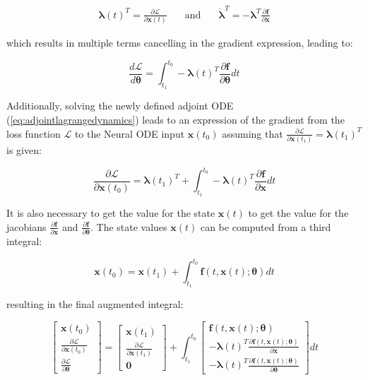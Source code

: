 \begin{equation}
    \begin{aligned}
        \bm{\lambda}(t)^T = \frac{\partial \mathcal{L}}{\partial \bm{x}(t)}
        & \quad \textrm{and} \quad & \dot{\bm{\lambda}}^T = - \bm{\lambda}^T \frac{\partial \bm{f}}{\partial \bm{x}}
    \end{aligned}
    \label{eq:adjointlagrangedynamics}
\end{equation}

\noindent which results in multiple terms cancelling in the gradient expression, leading to:

\begin{equation}
    \frac{d \mathcal{L}}{d \bm{\theta}} = \int_{t_1}^{t_0} -\bm{\lambda}(t)^T \frac{\partial \bm{f}}{\partial \bm{\theta}} dt
\end{equation}

Additionally, solving the newly defined adjoint ODE (\ref{eq:adjointlagrangedynamics}) leads to an expression of the gradient from the loss function $\mathcal{L}$ to the Neural ODE input $\bm{x}(t_0)$ assuming that $\frac{\partial \mathcal{L}}{\partial \bm{x}(t_1)} = \bm{\lambda}(t_1)^T$ is given:

\begin{equation}
    \frac{\partial \mathcal{L}}{\partial \bm{x}(t_0)} = \bm{\lambda}(t_1)^T + \int_{t_1}^{t_0} - \bm{\lambda}(t)^T \frac{\partial \bm{f}}{\partial \bm{x}} dt
\end{equation}

It is also necessary to get the value for the state $\bm{x}(t)$ to get the value for the jacobians $\frac{\partial \bm{f}}{\partial \bm{x}}$ and $\frac{\partial \bm{f}}{\partial \bm{\theta}}$. The state values $\bm{x}(t)$ can be computed from a third integral:

\begin{equation}
    \bm{x}(t_0) = \bm{x}(t_1) + \int_{t_1}^{t_0} \bm{f}(t, \bm{x}(t) ; \bm{\theta}) dt
\end{equation}

\noindent resulting in the final augmented integral:

\begin{equation}
    \begin{bmatrix}
    \bm{x}(t_0) \\
    \frac{\partial \mathcal{L}}{\partial \bm{x}(t_0)} \\
    \frac{\partial \mathcal{L}}{\partial \bm{\theta}}
    \end{bmatrix} = \begin{bmatrix}
    \bm{x}(t_1) \\
    \frac{\partial \mathcal{L}}{\partial \bm{x}(t_1)} \\
    \bm{0}
    \end{bmatrix} + \int_{t_1}^{t_0} \begin{bmatrix}
    \bm{f}(t, \bm{x}(t) ; \bm{\theta}) \\
    - \bm{\lambda}(t)^T \frac{\partial \bm{f}(t, \bm{x}(t) ; \bm{\theta})}{\partial \bm{x}} \\
    - \bm{\lambda}(t)^T \frac{\partial \bm{f}(t, \bm{x}(t) ; \bm{\theta})}{\partial \bm{\theta}}
    \end{bmatrix} dt
\end{equation}